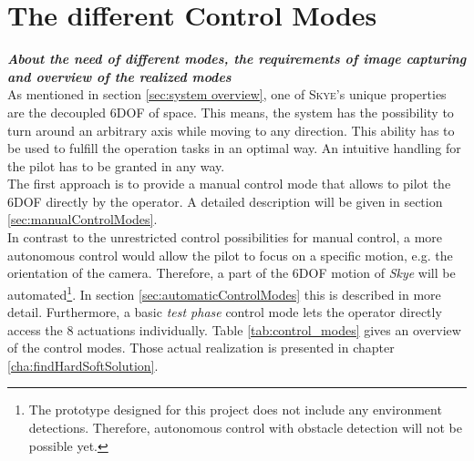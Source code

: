 \graphicspath{{graphics/HMI/}{graphics/control_modes/}}
\chapter{The different Control Modes}
\label{cha:DifferentControlModes}

\textbf{\textit{About the need of different modes, the requirements of image capturing and overview of the realized modes}} \\

As mentioned in section \ref{sec:system overview}, one of \textsc{Skye}'s unique properties are the decoupled 6DOF of space. This means, the system has the possibility to turn around an arbitrary axis while moving to any direction. This ability has to be used to fulfill the operation tasks in an optimal way. An intuitive handling for the pilot has to be granted in any way. \\ 
The first approach is to provide a manual control mode that allows to pilot the 6DOF directly by the operator. A detailed description will be given in section \ref{sec:manualControlModes}. \\ 
In contrast to the unrestricted control possibilities for manual control, a more autonomous control would allow the pilot to focus on a specific motion, e.g. the orientation of the camera. Therefore, a part of the 6DOF motion of \textit{Skye} will be automated\footnote{The prototype designed for this project does not include any environment detections. Therefore, autonomous control with obstacle detection will not be possible yet.}. In section \ref{sec:automaticControlModes} this is described in more detail. Furthermore, a basic \textit{test phase} control mode lets the operator directly access the 8 actuations individually. Table \ref{tab:control_modes} gives an overview of the control modes. Those actual realization is presented in chapter \ref{cha:findHardSoftSolution}.

